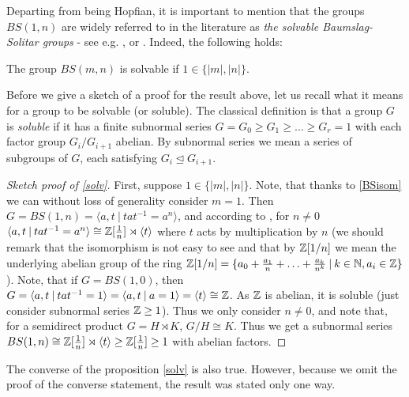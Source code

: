 Departing from being Hopfian, it is important to mention that the groups $BS(1,n)$ are widely referred to in the literature as \emph{the solvable Baumslag-Solitar groups} - see e.g. \cite{BoDePu2018}, \cite{FaMo98} or \cite{Gr96}. Indeed, the following holds:

\begin{proposition}\label{solv}
    The group $BS(m,n)$ is solvable if $1 \in \{|m|,|n|\}$.
\end{proposition} 

\begin{remark}
    Before we give a sketch of a proof for the result above, let us recall what it means for a group to be solvable (or soluble). The classical definition is that a group $G$ is \emph{soluble} if it has a finite subnormal series $G = G_0 \ge G_1 \ge \ldots \ge G_r =1$ with each factor group $G_i/G_{i+1}$ abelian. By subnormal series we mean a series of subgroups of $G$, each satisfying $G_i \unlhd G_{i+1}$.
\end{remark}

\begin{proof}[Sketch proof of \ref{solv}]
    First, suppose $1 \in \{|m|,|n|\}$. Note, that thanks to \ref{BSisom} we can without loss of generality consider $m = 1$. Then $G = BS(1,n) = \langle a,t \: | \: tat^{-1} = a^n \rangle$, and according to \cite[Theorem 5]{Gi79}, for $n \neq 0$ $\langle a,t \: | \: tat^{-1} = a^n \rangle \cong \mathbb{Z}[\frac{1}{n}]\rtimes \langle t \rangle$
    where $t$ acts by multiplication by $n$ (we should remark that the isomorphism is not easy to see and that by $\mathbb{Z}[1/n]$ we mean the underlying abelian group of the ring $\mathbb{Z}[1/n] = \{a_0 + \frac{a_1}{n} + \ldots + \frac{a_k}{n^k}\:|\:k \in \mathbb{N}, a_i \in \mathbb{Z}\}$). Note, that if $G = BS(1,0)$, then $G = \langle a,t \: | \: tat^{-1} = 1 \rangle = \langle a,t \: | \: a = 1 \rangle = \langle t \rangle \cong \mathbb{Z}$. As $\mathbb{Z}$ is abelian, it is soluble (just consider subnormal series $\mathbb{Z} \ge 1$). Thus we only consider $n \neq 0$, and note that, for a semidirect product $G = H \rtimes K$, $G/H \cong K$. Thus we get a subnormal series $BS(1,n) \cong \mathbb{Z}[\frac{1}{n}]\rtimes \langle t \rangle \ge \mathbb{Z}[\frac{1}{n}] \ge 1$ with abelian factors.
\end{proof}

\begin{remark}
    The converse of the proposition \ref{solv} is also true. However, because we omit the proof of the converse statement, the result was stated only one way.
\end{remark}


